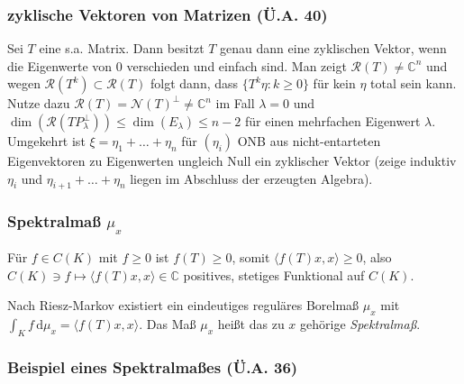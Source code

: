 \documentclass[11pt,a4paper]{scrartcl}
\newcommand{\C}{\mathbb{C}} %
\newcommand{\Nc}{\mathcal{N}}
\newcommand{\Rc}{\mathcal{R}}
\theoremstyle{plain}
\theoremstyle{definition}
\theoremstyle{remark}
\begin{document}
\subsubsection{zyklische Vektoren von Matrizen (Ü.A. 40)}

Sei $T$ eine s.a. Matrix. Dann besitzt $T$ genau dann eine zyklischen Vektor, wenn die Eigenwerte von $0$ verschieden und einfach sind. Man zeigt $\Rc(T)\neq \C^n$ und wegen $\Rc(T^k) \subset \Rc(T)$ folgt dann, dass $\{T^k\eta: k\geq 0\}$ für kein $\eta$ total sein kann. Nutze dazu $\Rc(T)=\Nc(T)^\bot\neq \C^n$ im Fall $\lambda = 0$ und $\dim(\Rc(TP_\lambda^\bot))\leq \dim(E_\lambda) \leq n-2$ für einen mehrfachen Eigenwert $\lambda$. Umgekehrt ist $\xi=\eta_1+\dots+\eta_n$ für $(\eta_i)$ ONB aus nicht-entarteten Eigenvektoren zu Eigenwerten ungleich Null ein zyklischer Vektor (zeige induktiv $\eta_i$ und $\eta_{i+1}+\dots+\eta_n$ liegen im Abschluss der erzeugten Algebra).

\subsubsection{Spektralmaß $\mu_x$}

Für $f\in C(K)$ mit $f \geq 0$ ist $f(T) \geq 0$, somit $\langle f(T)x, x \rangle \geq 0$, also $C(K)\ni f \mapsto \langle f(T)x,x \rangle \in \C$ positives, stetiges Funktional auf $C(K)$.

Nach Riesz-Markov existiert ein eindeutiges reguläres Borelmaß $\mu_x$ mit $\int_K f \,\mathrm{d}\mu_x = \langle f(T)x, x \rangle$. Das Maß $\mu_x$ heißt das zu $x$ gehörige \emph{Spektralmaß}.


\subsubsection{Beispiel eines Spektralmaßes (Ü.A. 36)}
\end{document}
